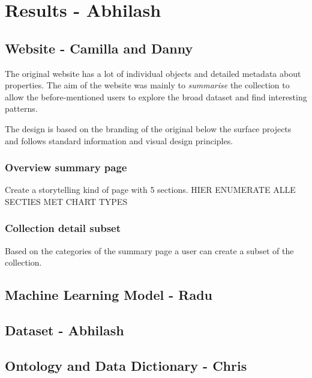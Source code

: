 \section{Results - Abhilash}

\subsection{Website - Camilla and Danny}

The original website has a lot of individual objects and detailed metadata about properties. The aim of the website was mainly to \textit{summarise} the collection to allow the before-mentioned users to explore the broad dataset and find interesting patterns.

The design is based on the branding of the original below the surface projects and follows standard information and visual design principles.

\subsubsection{Overview summary page}
Create a storytelling kind of page with 5 sections. HIER ENUMERATE ALLE SECTIES MET CHART TYPES

\subsubsection{Collection detail subset}
Based on the categories of the summary page a user can create a subset of the collection.

\subsection{Machine Learning Model - Radu}

\subsection{Dataset - Abhilash}

\subsection{Ontology and Data Dictionary - Chris}
